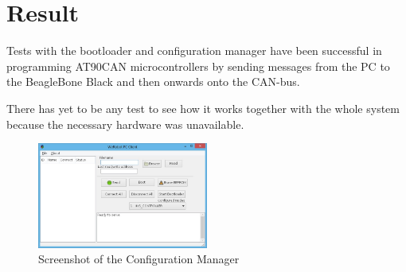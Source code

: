 \section{Result}\label{sec:result}
Tests with the bootloader and configuration manager have been successful in programming AT90CAN microcontrollers by sending messages from the PC to the BeagleBone Black and then onwards onto the CAN-bus.

There has yet to be any test to see how it works together with the whole system because the necessary hardware was unavailable.

\begin{figure}[h]
    \includegraphics[width=0.5\textwidth]{./figure/cm.jpg}
    \caption{Screenshot of the Configuration Manager}
    \label{fig:cm_figure}
\end{figure}



%
%

